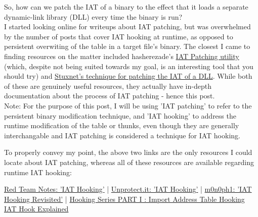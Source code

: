 So, how can we patch the IAT of a binary to the effect that it loads a separate dynamic-link library (DLL) every time the binary is run?
			\\

			I started looking online for writeups about IAT patching, but was overwhelmed by the number of posts that cover IAT hooking at runtime, as opposed to persistent
			overwiting of the table in a target file's binary. The closest I came to finding resources on the matter included hasherezade's \href{https://hasherezade.github.io/IAT_patcher/}{IAT Patching utility} (which, despite not being suited towards my goal, is an interesting tool that you should try) and
			\href{https://www.wired.com/images_blogs/threatlevel/2011/02/Symantec-Stuxnet-Update-Feb-2011.pdf}{Stuxnet's technique for patching the IAT of a DLL}.
			While both of these are genuinely useful resources, they actually have in-depth documentation about the process of IAT patching - hence this post.
			\\

			Note: For the purpose of this post, I will be using 'IAT patching' to refer to the persistent binary modification technique, and 'IAT hooking' to address the runtime modification of the table or thunks, even though they are generally interchangable and IAT patching is considered a technique for IAT hooking.

To properly convey my point, the above two links are the only resources I could locate about IAT patching, whereas all of these resources are available regarding runtime IAT hooking:

\href{https://www.ired.team/offensive-security/code-injection-process-injection/import-adress-table-iat-hooking}{Red Team Notes: 'IAT Hooking'} |
				\href{https://unprotect.it/technique/iat-hooking/}{Unprotect.it: 'IAT Hooking'} |
				\href{https://github.com/m0n0ph1/IAT-Hooking-Revisited}{m0n0ph1: 'IAT Hooking Revisited'} |
				\href{https://relearex.wordpress.com/2017/12/26/hooking-series-part-i-import-address-table-hooking/}{Hooking Series PART I : Import Address Table Hooking}
				\href{https://www.unknowncheats.me/forum/general-programming-and-reversing/443248-iat-hook-explained.html}{IAT Hook Explained}
